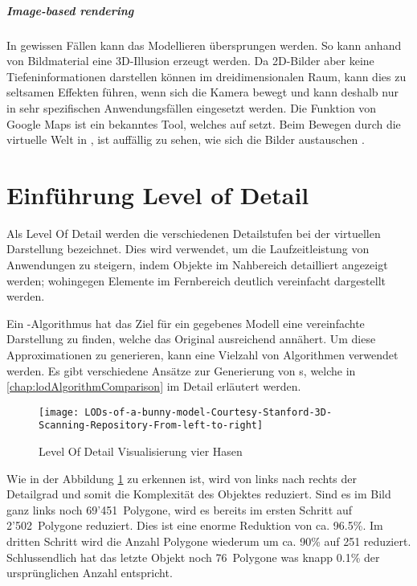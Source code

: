\subparagraph{Image-based rendering}
In gewissen Fällen kann das Modellieren übersprungen werden. So kann anhand von Bildmaterial eine 3D-Illusion erzeugt werden. Da 2D-Bilder aber keine Tiefeninformationen darstellen können im dreidimensionalen Raum, kann dies zu seltsamen Effekten führen, wenn sich die Kamera bewegt und kann deshalb nur in sehr spezifischen Anwendungsfällen eingesetzt werden. Die  Funktion von Google Maps ist ein bekanntes Tool, welches auf  setzt.
Beim Bewegen durch die virtuelle Welt in , ist auffällig zu sehen, wie sich die Bilder austauschen \cite{imageBasedRendering}.

\section{Einführung Level of Detail}
\label{chap:lodIntroduction}
Als Level Of Detail werden die verschiedenen Detailstufen bei der virtuellen Darstellung bezeichnet.
Dies wird verwendet, um die Laufzeitleistung von Anwendungen zu steigern, indem Objekte im Nahbereich detailliert angezeigt werden; wohingegen Elemente im Fernbereich deutlich vereinfacht dargestellt werden.

Ein -Algorithmus hat das Ziel für ein gegebenes Modell eine vereinfachte Darstellung zu finden, welche das Original ausreichend annähert. Um diese Approximationen zu generieren, kann eine Vielzahl von Algorithmen verwendet werden. Es gibt verschiedene Ansätze zur Generierung von s, welche in \autoref{chap:lodAlgorithmComparison} im Detail erläutert werden.

\begin{figure}[H]
\centering
\texttt{[image: LODs-of-a-bunny-model-Courtesy-Stanford-3D-Scanning-Repository-From-left-to-right]}
\caption{Level Of Detail Visualisierung vier Hasen \cite{stanfordBunnyModel}}
\label{fig:LevelOfDetailVisualisierungvierHasen}
\end{figure}

Wie in der Abbildung \ref{fig:LevelOfDetailVisualisierungvierHasen} zu erkennen ist, wird von links nach rechts der Detailgrad und somit die Komplexität des Objektes reduziert. Sind es im Bild ganz links noch 69'451 Polygone, wird es bereits im ersten Schritt auf 2'502 Polygone reduziert. Dies ist eine enorme Reduktion von ca. 96.5\%. Im dritten Schritt wird die Anzahl Polygone wiederum um ca. 90\% auf 251 reduziert. Schlussendlich hat das letzte Objekt noch 76 Polygone was knapp 0.1\% der ursprünglichen Anzahl entspricht.

